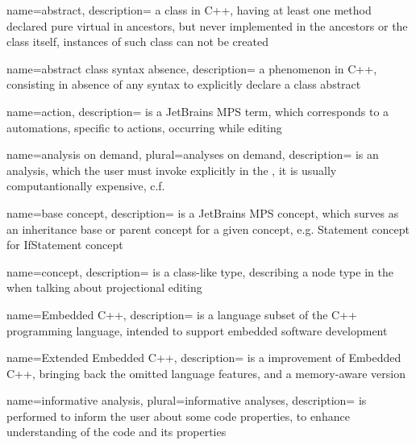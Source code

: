 {
  name=abstract,
  description={ a class in C++, having at least one method declared pure virtual in ancestors, but never implemented in the ancestors or the
  class itself, instances of such class can not be created}
}

{
  name=abstract class syntax absence,
  description={ a phenomenon in C++, consisting in absence of any syntax to explicitly declare a class abstract}
}

{
  name=action,
  description={ is a JetBrains MPS term, which corresponds to a automations, specific to actions, occurring while editing}
}




{
  name=analysis on demand,
  plural=analyses on demand,
  description={ is an analysis, which the user must invoke explicitly in the , it is usually computantionally expensive, c.f.  }
}




{
  name=base concept,
  description={ is a JetBrains MPS concept, which surves as an inheritance base or parent concept for a given concept, e.g. Statement concept for IfStatement concept}
}


{
  name=concept,
  description={ is a class-like type, describing a node type in the  when talking about projectional editing}
}




{
  name=Embedded C++,
  description={ is a language subset of the C++ programming language, intended to
  support embedded software development}
}

{
  name=Extended Embedded C++,
  description={ is a improvement of Embedded C++, bringing back the omitted language features, and a memory-aware  version}
}

{
  name=informative analysis,
  plural=informative analyses,
  description={ is performed to inform the user about some code properties, to enhance understanding of the code and its properties}
}


